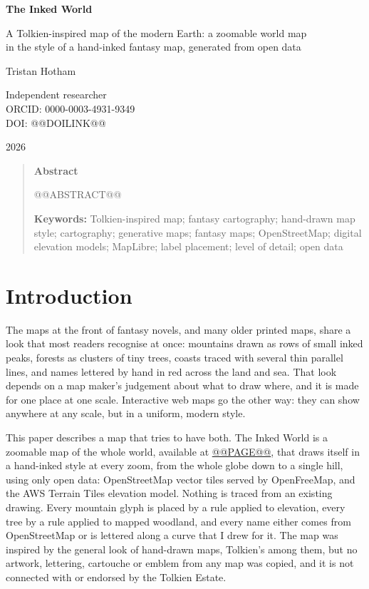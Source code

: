 \documentclass[11pt,a4paper]{article}
\begin{document}
\begin{center}
{\Large\bfseries The Inked World\par}
\vspace{0.4em}
{\large A Tolkien-inspired map of the modern Earth: a zoomable world map\\in the style of a hand-inked fantasy map, generated from open data\par}
\vspace{1.2em}
{\large Tristan Hotham\par}
\vspace{0.3em}
{\small Independent researcher\\
ORCID: 0000-0003-4931-9349\\
DOI: @@DOILINK@@\par}
\vspace{0.8em}
2026
\end{center}

\begin{quote}
\small
\begin{center}\textbf{Abstract}\end{center}
@@ABSTRACT@@

\textbf{Keywords:} Tolkien-inspired map; fantasy cartography; hand-drawn map style; cartography; generative maps; fantasy maps; OpenStreetMap; digital elevation models; MapLibre; label placement; level of detail; open data
\end{quote}

\section{Introduction}
The maps at the front of fantasy novels, and many older printed maps, share a look that most readers recognise at once: mountains drawn as rows of small inked peaks, forests as clusters of tiny trees, coasts traced with several thin parallel lines, and names lettered by hand in red across the land and sea. That look depends on a map maker's judgement about what to draw where, and it is made for one place at one scale. Interactive web maps go the other way: they can show anywhere at any scale, but in a uniform, modern style.

This paper describes a map that tries to have both. The Inked World is a zoomable map of the whole world, available at \url{@@PAGE@@}, that draws itself in a hand-inked style at every zoom, from the whole globe down to a single hill, using only open data: OpenStreetMap vector tiles served by OpenFreeMap, and the AWS Terrain Tiles elevation model. Nothing is traced from an existing drawing. Every mountain glyph is placed by a rule applied to elevation, every tree by a rule applied to mapped woodland, and every name either comes from OpenStreetMap or is lettered along a curve that I drew for it. The map was inspired by the general look of hand-drawn maps, Tolkien's among them, but no artwork, lettering, cartouche or emblem from any map was copied, and it is not connected with or endorsed by the Tolkien Estate.
\end{document}
